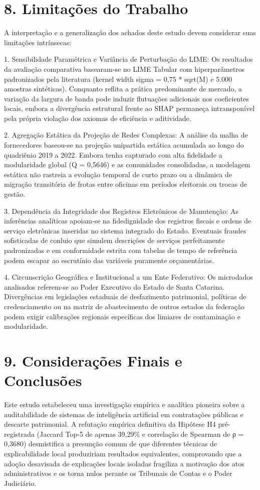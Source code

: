 \documentclass[10pt,a4paper,journal]{article}
\begin{document}
\section{8. Limitações do Trabalho}
A interpretação e a generalização dos achados deste estudo devem considerar suas limitações intrínsecas:

1. Sensibilidade Paramétrica e Variância de Perturbação do LIME: Os resultados da avaliação comparativa basearam-se no LIME Tabular com hiperparâmetros padronizados pela literatura (kernel width sigma = 0,75 * sqrt(M) e 5.000 amostras sintéticas). Conquanto reflita a prática predominante de mercado, a variação da largura de banda pode induzir flutuações adicionais nos coeficientes locais, embora a divergência estrutural frente ao SHAP permaneça intransponível pela própria violação dos axiomas de eficiência e aditividade.

2. Agregação Estática da Projeção de Redes Complexas: A análise da malha de fornecedores baseou-se na projeção unipartida estática acumulada ao longo do quadriênio 2019 a 2022. Embora tenha capturado com alta fidelidade a modularidade global (Q = 0,5646) e as comunidades consolidadas, a modelagem estática não rastreia a evolução temporal de curto prazo ou a dinâmica de migração transitória de frotas entre oficinas em períodos eleitorais ou trocas de gestão.

3. Dependência da Integridade dos Registros Eletrônicos de Manutenção: As inferências analíticas apoiam-se na fidedignidade dos registros fiscais e ordens de serviço eletrônicas inseridas no sistema integrado do Estado. Eventuais fraudes sofisticadas de conluio que simulem descrições de serviços perfeitamente padronizadas e em conformidade estrita com tabelas de tempo de referência podem escapar ao escrutínio das variáveis puramente orçamentárias.

4. Circunscrição Geográfica e Institucional a um Ente Federativo: Os microdados analisados referem-se ao Poder Executivo do Estado de Santa Catarina. Divergências em legislações estaduais de desfazimento patrimonial, políticas de credenciamento ou na matriz de abastecimento de outros estados da federação podem exigir calibrações regionais específicas dos limiares de contaminação e modularidade.

\section{9. Considerações Finais e Conclusões}
Este estudo estabeleceu uma investigação empírica e analítica pioneira sobre a auditabilidade de sistemas de inteligência artificial em contratações públicas e descarte patrimonial. A refutação empírica definitiva da Hipótese H4 pré-registrada (Jaccard Top-5 de apenas 39,29\% e correlação de Spearman de ρ = 0,3680) desmistifica a presunção comum de que diferentes técnicas de explicabilidade local produziriam resultados equivalentes, comprovando que a adoção desavisada de explicações locais isoladas fragiliza a motivação dos atos administrativos e os torna nulos perante os Tribunais de Contas e o Poder Judiciário.
\end{document}
